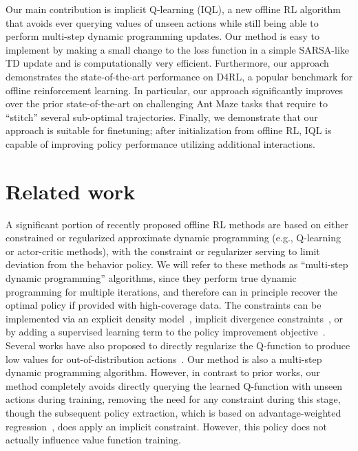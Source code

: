 \documentclass{article} %
\def\ourname{IQL\xspace}
\begin{document}
Our main contribution is implicit Q-learning (\ourname), a new offline RL algorithm that avoids ever querying values of unseen actions while still being able to perform multi-step dynamic programming updates.
Our method is easy to implement by making a small change to the loss function in a simple SARSA-like TD update and is computationally very efficient. Furthermore, our approach demonstrates the state-of-the-art performance on D4RL, a popular benchmark for offline reinforcement learning. In particular, our approach significantly improves over the prior state-of-the-art on challenging Ant Maze tasks that require to ``stitch'' several sub-optimal trajectories. Finally, we demonstrate that our approach is suitable for finetuning; after initialization from offline RL, \ourname is capable of improving policy performance utilizing additional interactions.


\section{Related work}

A significant portion of recently proposed offline RL methods are based on either constrained or regularized approximate dynamic programming (e.g., Q-learning or actor-critic methods), with the constraint or regularizer serving to limit deviation from the behavior policy. We will refer to these methods as ``multi-step dynamic programming'' algorithms, since they perform true dynamic programming for multiple iterations, and therefore can in principle recover the optimal policy if provided with high-coverage data.
The constraints can be implemented via an explicit density model~\citep{wu2019behavior, fujimoto2019off, kumar2019stabilizing}, implicit divergence constraints~\citep{nair2020awac, wang2020critic, peters2007reinforcement, peng2019advantage}, or by adding a supervised learning term to the policy improvement objective~\citep{fujimoto2021minimalist}. Several works have also proposed to directly regularize the Q-function to produce low values for out-of-distribution actions~\citep{kostrikov2021offline, kumar2020conservative}. Our method is also a multi-step dynamic programming algorithm. However, in contrast to prior works, our method completely avoids directly querying the learned Q-function with unseen actions during training, removing the need for any constraint during this stage, though the subsequent policy extraction, which is based on advantage-weighted regression~\citep{peng2019advantage,nair2020awac}, does apply an implicit constraint. However, this policy does not actually influence value function training.
\end{document}

